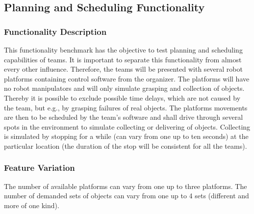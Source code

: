 
\subsection{Planning and Scheduling Functionality}
\label{ssec:PlanningScheduling}


\subsubsection{Functionality Description}
\label{sssec:PlanningSchedulingDescription}

This functionality benchmark has the objective to test planning and scheduling capabilities of teams. 
It is important to separate this functionality from almost every other influence. 
Therefore, the teams will be presented with several robot platforms containing control software from the organizer.
The platforms will have no robot manipulators and will only simulate grasping and collection of objects.
Thereby it is possible to exclude possible time delays, which are not caused by the team, but e.g., by grasping failures of real objects.
The platforms movements are then to be scheduled by the team's software and shall drive through several spots in the environment to simulate collecting or delivering of objects.
Collecting is simulated by stopping for a while (can vary from one up to ten seconds) at the particular location (the duration of the stop will be consistent for all the teams).

\subsubsection{Feature Variation}
\label{sssec:PlanningSchedulingVariation}

The number of available platforms can vary from one up to three platforms.
The number of demanded sets of objects can vary from one up to 4 sets (different and more of one kind).


